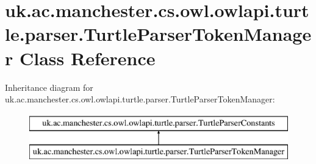 \hypertarget{classuk_1_1ac_1_1manchester_1_1cs_1_1owl_1_1owlapi_1_1turtle_1_1parser_1_1_turtle_parser_token_manager}{\section{uk.\-ac.\-manchester.\-cs.\-owl.\-owlapi.\-turtle.\-parser.\-Turtle\-Parser\-Token\-Manager Class Reference}
\label{classuk_1_1ac_1_1manchester_1_1cs_1_1owl_1_1owlapi_1_1turtle_1_1parser_1_1_turtle_parser_token_manager}
}
Inheritance diagram for uk.\-ac.\-manchester.\-cs.\-owl.\-owlapi.\-turtle.\-parser.\-Turtle\-Parser\-Token\-Manager\-:\begin{figure}[H]
\begin{center}
\leavevmode
\includegraphics[height=2.000000cm]{classuk_1_1ac_1_1manchester_1_1cs_1_1owl_1_1owlapi_1_1turtle_1_1parser_1_1_turtle_parser_token_manager}
\end{center}
\end{figure}

